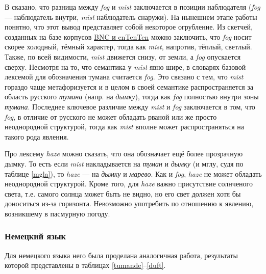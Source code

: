 \par В \citep{соколовский2017} сказано, что разница между \textit{fog} и \textit{mist} заключается в позиции наблюдателя (\textit{fog} --- наблюдатель внутри, \textit{mist} наблюдатель снаружи). На нынешнем этапе работы понятно, что этот вывод представляет собой некоторое огрубление. Из скетчей, созданных на базе корпусов \hyperlink{tenten}{BNC и enTenTen} можно заключить, что \textit{fog} носит скорее холодный, тёмный характер, тогда как \textit{mist}, напротив, тёплый, светлый. Также, по всей видимости, \textit{mist} движется снизу, от земли, а \textit{fog} опускается сверху. Несмотря на то, что семантика у \textit{mist} явно шире, в словарях базовой лексемой для обозначения тумана считается \textit{fog}. Это связано с тем, что \textit{mist} гораздо чаще метафоризуется и в целом в своей семантике распространяется за область русского \textit{тумана} (напр. на \textit{дымку}), тогда как \textit{fog} полностью внутри зоны \textit{тумана}. Последнее ключевое различие между \textit{mist} и \textit{fog} заключается в том, что \textit{fog}, в отличие от русского  не может обладать рваной или же просто неоднородной структурой, тогда как \textit{mist} вполне может распространяться на такого рода явления.

Про лексему \textit{haze} можно сказать, что она обозначает ещё более прозрачную дымку. То есть если \textit{mist} накладывается на \textit{туман} и \textit{дымку} (и мглу, судя по таблице \ref{mgla}), то \textit{haze} --- на \textit{дымку} и \textit{марево}. Как и \textit{fog}, \textit{haze} не может обладать неоднородной структурой. Кроме того, для \textit{haze} важно присутствие солнченого света, т.е. самого солнца может быть не видно, но его свет должен хотя бы доноситься из-за горизонта. Невозможно употребить  по отношению к явлению, возникшему в пасмурную погоду.

\subsubsection{Немецкий язык}
Для немецкого языка него была проделана аналогичная работа, результаты которой представлены в таблицах \ref{tumande}--\ref{duft}. 

